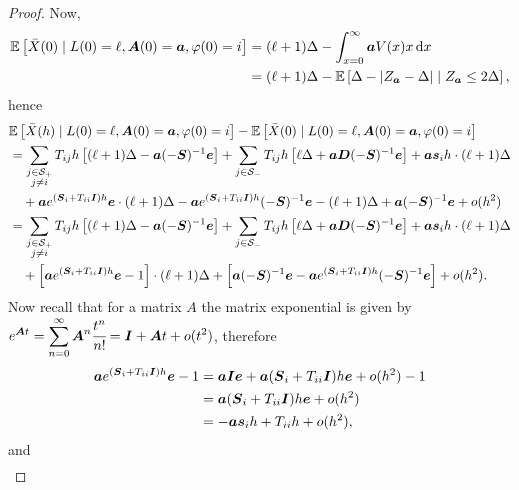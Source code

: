 \begin{proof}
	Now, 
	\begin{align}
		\mathbb E\left [\bar X(0)\mid L(0)= \ell,\boldsymbol A(0)=\boldsymbol a,\varphi(0)=i\right] &=(\ell+1)\Delta - \int_{x=0}^\infty \boldsymbol a V(x) x\, \mathrm{d} x \nonumber 
		\\& = (\ell+1)\Delta - \mathbb E\left[\Delta - |Z_{\boldsymbol a}-\Delta|\mid Z_{\boldsymbol a}\leq 2\Delta\right],
	\end{align}
	hence 
	\begin{align}
		&\mathbb E\left[\bar X(h)\mid L(0)=\ell,\boldsymbol A(0)=\boldsymbol a,\varphi(0)=i\right] - \mathbb E\left [\bar X(0)\mid L(0)=\ell,\boldsymbol A(0)=\boldsymbol a,\varphi(0)=i\right] \nonumber 
		\\&= \sum_{\substack{j\in\mathcal S_+\\j\neq i}}T_{ij}h \left[ (\ell+1)\Delta - \boldsymbol a (-\boldsymbol S)^{-1}\boldsymbol e \right] \nonumber 
		+ \sum_{j\in\mathcal S_-}T_{ij}h \left[ \ell\Delta + \boldsymbol a\boldsymbol D(-\boldsymbol S)^{-1}\boldsymbol e \right] \nonumber
		+ \boldsymbol a \boldsymbol s_i h \cdot (\ell+1)\Delta  \nonumber
		\\&\quad {} + \boldsymbol a e^{(\boldsymbol S_i + T_{ii}\boldsymbol I)h}\boldsymbol e \cdot (\ell+1)\Delta - \boldsymbol a e^{(\boldsymbol S_i + T_{ii}\boldsymbol I)h} (-\boldsymbol S)^{-1}\boldsymbol e - (\ell+1)\Delta + \boldsymbol a (-\boldsymbol S)^{-1}\boldsymbol e + o(h^2) \nonumber 
		\\&= \sum_{\substack{j\in\mathcal S_+\\j\neq i}}T_{ij}h \left[ (\ell+1)\Delta - \boldsymbol a (-\boldsymbol S)^{-1}\boldsymbol e \right] \nonumber 
		+ \sum_{j\in\mathcal S_-}T_{ij}h \left[ \ell\Delta + \boldsymbol a\boldsymbol D(-\boldsymbol S)^{-1}\boldsymbol e \right] \nonumber
		+ \boldsymbol a \boldsymbol s_i h \cdot (\ell+1)\Delta  \nonumber
		\\&\quad {} + \left[\boldsymbol a e^{(\boldsymbol S_i + T_{ii}\boldsymbol I)h}\boldsymbol e - 1\right] \cdot (\ell+1)\Delta + \left[\boldsymbol a (-\boldsymbol S)^{-1}\boldsymbol e - \boldsymbol a e^{(\boldsymbol S_i + T_{ii}\boldsymbol I)h} (-\boldsymbol S)^{-1}\boldsymbol e \right] + o(h^2). \label{eqnLc vwjb}
	\end{align}
	Now recall that for a matrix \(A\) the matrix exponential is given by \(\displaystyle e^{\boldsymbol At} = \sum_{n=0}^\infty \boldsymbol A^n\cfrac{t^n}{n!} = \boldsymbol I + \boldsymbol At + o(t^2)\), therefore  
	\begin{align}\boldsymbol a e^{(\boldsymbol S_i + T_{ii}\boldsymbol I)h}\boldsymbol e - 1 &= \boldsymbol a \boldsymbol I \boldsymbol e + \boldsymbol a (\boldsymbol S_i + T_{ii}\boldsymbol I)h \boldsymbol e + o(h^2) - 1 \nonumber 
	\\&= \boldsymbol a (\boldsymbol S_i + T_{ii}\boldsymbol I)h \boldsymbol e + o(h^2) \nonumber
	\\&= -\boldsymbol a \boldsymbol s_ih  + T_{ii}h + o(h^2) ,\label{eqnLvskneq}\end{align}
	and 
	\begin{align}

\end{align}
\end{proof}
